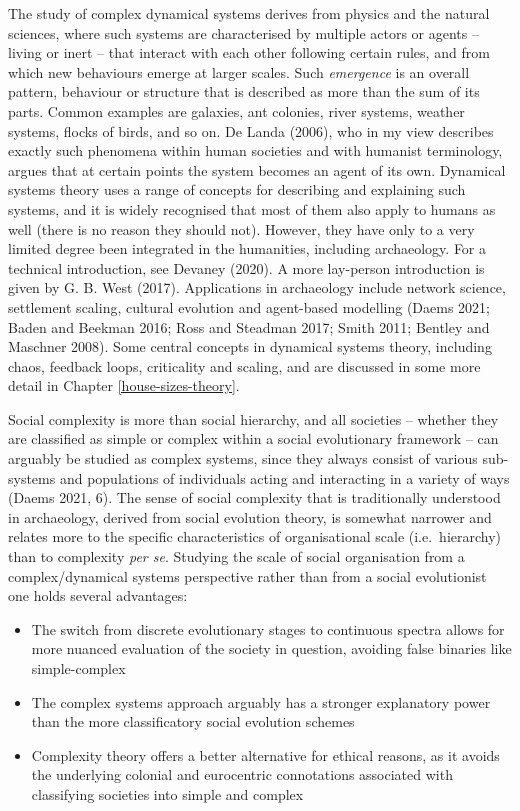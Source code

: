 \documentclass[
  12pt,
  a4paper, twoside]{book}
\begin{document}
The study of complex dynamical systems derives from physics and the natural sciences, where such systems are characterised by multiple actors or agents -- living or inert -- that interact with each other following certain rules, and from which new behaviours emerge at larger scales. Such \emph{emergence} is an overall pattern, behaviour or structure that is described as more than the sum of its parts. Common examples are galaxies, ant colonies, river systems, weather systems, flocks of birds, and so on. De Landa (2006), who in my view describes exactly such phenomena within human societies and with humanist terminology, argues that at certain points the system becomes an agent of its own. Dynamical systems theory uses a range of concepts for describing and explaining such systems, and it is widely recognised that most of them also apply to humans as well (there is no reason they should not). However, they have only to a very limited degree been integrated in the humanities, including archaeology. For a technical introduction, see Devaney (2020). A more lay-person introduction is given by G. B. West (2017). Applications in archaeology include network science, settlement scaling, cultural evolution and agent-based modelling (Daems 2021; Baden and Beekman 2016; Ross and Steadman 2017; Smith 2011; Bentley and Maschner 2008). Some central concepts in dynamical systems theory, including chaos, feedback loops, criticality and scaling, and are discussed in some more detail in Chapter \ref{house-sizes-theory}.

Social complexity is more than social hierarchy, and all societies -- whether they are classified as simple or complex within a social evolutionary framework -- can arguably be studied as complex systems, since they always consist of various sub-systems and populations of individuals acting and interacting in a variety of ways (Daems 2021, 6). The sense of social complexity that is traditionally understood in archaeology, derived from social evolution theory, is somewhat narrower and relates more to the specific characteristics of organisational scale (i.e.~hierarchy) than to complexity \emph{per se}. Studying the scale of social organisation from a complex/dynamical systems perspective rather than from a social evolutionist one holds several advantages:

\begin{itemize}
\item
  The switch from discrete evolutionary stages to continuous spectra allows for more nuanced evaluation of the society in question, avoiding false binaries like simple-complex
\item
  The complex systems approach arguably has a stronger explanatory power than the more classificatory social evolution schemes
\item
  Complexity theory offers a better alternative for ethical reasons, as it avoids the underlying colonial and eurocentric connotations associated with classifying societies into simple and complex
\end{itemize}
\end{document}
